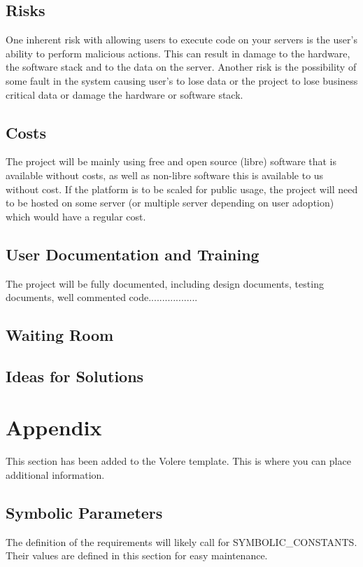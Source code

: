 \documentclass[12pt, titlepage]{article}
\begin{document}
  \subsection{Risks}
  One inherent risk with allowing users to execute code on your servers is the
  user's ability to perform malicious actions. This can result in damage to the
  hardware, the software stack and to the data on the server.  Another risk is
  the possibility of some fault in the system causing user's to lose data or
  the project to lose business critical data or damage the hardware or software
  stack.

  \subsection{Costs}
  The project will be mainly using free and open source (libre) software that
  is available without costs, as well as non-libre software this is available
  to us without cost. If the platform is to be scaled for public usage, the
  project will need to be hosted on some server (or multiple server depending
  on user adoption) which would have a regular cost.

  \subsection{User Documentation and Training}
  The project will be fully documented, including design documents, testing documents, well commented code..................

  \subsection{Waiting Room}

  \subsection{Ideas for Solutions}





\newpage

\section{Appendix}

This section has been added to the Volere template.  This is where you can
place additional information.

\subsection{Symbolic Parameters}

The definition of the requirements will likely call for SYMBOLIC\_CONSTANTS.
Their values are defined in this section for easy maintenance.
\end{document}
